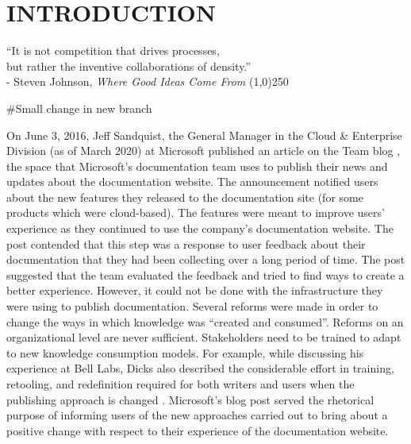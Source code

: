 \chapter{INTRODUCTION}
\label{chap-one}

\begin{flushright}

  ``It is not competition that drives processes,
  \\but rather the inventive collaborations of density.''
  \\- Steven Johnson, \textit{Where Good Ideas Come From}
  \line(1,0){250}
\end{flushright}

#Small change in new branch

On June 3, 2016, Jeff Sandquist, the General Manager in the Cloud \& Enterprise Division (as of March 2020) at Microsoft published an article on the Team blog \cite{sandquist}, the space that Microsoft’s documentation team uses to publish their news and updates about the documentation website. The announcement notified users about the new features they released to the documentation site (for some products which were cloud-based). The features were meant to improve users' experience as they continued to use the company’s documentation website. The post contended that this step was a response to user feedback about their documentation that they had been collecting over a long period of time. The post suggested that the team evaluated the feedback and tried to find ways to create a better experience. However, it could not be done with the infrastructure they were using to publish documentation. Several reforms were made in order to change the ways in which knowledge was “created and consumed”. Reforms on an organizational level are never sufficient. Stakeholders need to be trained to adapt to new knowledge consumption models. For example, while discussing his experience at Bell Labs, Dicks also described the considerable effort in training, retooling, and redefinition required for both writers and users when the publishing approach is changed \cite{dicks1994integrating}. Microsoft’s blog post served the rhetorical purpose of informing users of the new approaches carried out to bring about a positive change with respect to their experience of the documentation website.

